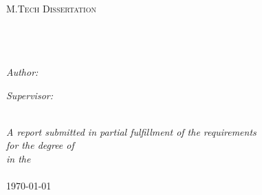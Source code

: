 \documentclass[10pt, a4paper, oneside]{Thesis} %
\begin{document}
\begin{titlepage}
\begin{center}

\textsc{\LARGE \univname}\\[1.5cm] %
\textsc{\Large M.Tech Dissertation}\\[0.5cm] %

\HRule \\[0.4cm] %
{\huge \bfseries \ttitle}\\[0.4cm] %
\HRule \\[1.5cm] %
 
\begin{minipage}{0.4\textwidth}
\begin{flushleft} \large
\emph{Author:}\\
\href{http://www.cse.iitb.ac.in/~nikhilkumar}{\authornames} %
\end{flushleft}
\end{minipage}
\begin{minipage}{0.4\textwidth}
\begin{flushright} \large
\emph{Supervisor:} \\
\href{http://www.cse.iitb.ac.in/~pb}{\supname} %
\end{flushright}
\end{minipage}\\[3cm]
 
\large \textit{A report submitted in partial fulfillment of the requirements\\ for the degree of \degreename}\\[0.3cm] %
\textit{in the}\\[0.4cm]
\deptname\\[2cm] %
 
{\large \today}\\[4cm] %
 
\vfill
\end{center}

\end{titlepage}

\end{document}
